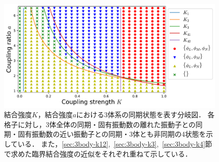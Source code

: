 \documentclass[../main]{subfiles}
\begin{document}
    \begin{figure}[t]
    \centering
    \includegraphics[width=135mm]{images/three-body-phase.pdf}
    \centering
    \caption{結合強度$K$，結合強度$a$における3体系の同期状態を表す分岐図．
    各格子に対し，3体全体の同期・固有振動数の離れた振動子との同期・固有振動数の近い振動子との同期・3体とも非同期の4状態を示している．
    また，\ref{sec:3body-k12},\ \ref{sec:3body-k3},\ \ref{sec:3body-k4}節で求めた臨界結合強度の近似をそれぞれ重ねて示している．
    }
    \label{fig:3body-phase}
    \end{figure}
\end{document}
